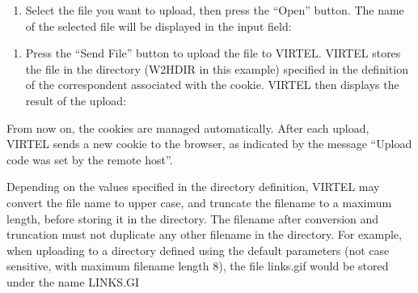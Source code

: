\documentclass[letterpaper,10pt,english]{sphinxmanual}
\begin{document}
\sphinxAtStartPar
{}

\sphinxAtStartPar
{}
\begin{enumerate}
%
\setcounter{enumi}{3}
\item {} 
\sphinxAtStartPar
Select the file you want to upload, then press the “Open” button. The name of the selected file will be displayed in the input field:

\end{enumerate}

\sphinxAtStartPar
{}

\sphinxAtStartPar
{}
\begin{enumerate}
%
\setcounter{enumi}{4}
\item {} 
\sphinxAtStartPar
Press the “Send File” button to upload the file to VIRTEL. VIRTEL stores the file in the directory (W2H\sphinxhyphen{}DIR in this example) specified in the definition of the correspondent associated with the cookie. VIRTEL then displays the result of the upload:

\end{enumerate}

\sphinxAtStartPar
{}

\sphinxAtStartPar
{}

\sphinxAtStartPar
From now on, the cookies are managed automatically. After each upload, VIRTEL sends a new cookie to the browser, as indicated by the message “Upload code was set by the remote host”.

\sphinxAtStartPar
Depending on the values specified in the directory definition, VIRTEL may convert the file name to upper case, and truncate the filename to a maximum length, before storing it in the directory. The filename after conversion and truncation must not duplicate any other filename in the directory. For example, when uploading to a directory defined using the default parameters (not case sensitive, with maximum filename length 8), the file links.gif would be stored under the name LINKS.GI

\ignorespaces 
\end{document}
